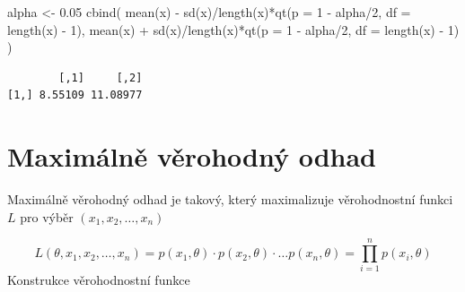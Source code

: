 \documentclass[
  letterpaper,
  DIV=11,
  numbers=noendperiod]{scrreprt}
\newenvironment{Shaded}{\begin{snugshade}}{\end{snugshade}}
\newcommand{\AttributeTok}[1]{\textcolor[rgb]{0.40,0.45,0.13}{#1}}
\newcommand{\DecValTok}[1]{\textcolor[rgb]{0.68,0.00,0.00}{#1}}
\newcommand{\FloatTok}[1]{\textcolor[rgb]{0.68,0.00,0.00}{#1}}
\newcommand{\FunctionTok}[1]{\textcolor[rgb]{0.28,0.35,0.67}{#1}}
\newcommand{\NormalTok}[1]{\textcolor[rgb]{0.00,0.23,0.31}{#1}}
\newcommand{\OtherTok}[1]{\textcolor[rgb]{0.00,0.23,0.31}{#1}}
\newcommand{\SpecialCharTok}[1]{\textcolor[rgb]{0.37,0.37,0.37}{#1}}
\begin{document}
\begin{Shaded}
\begin{Highlighting}[]
\NormalTok{alpha }\OtherTok{\textless{}{-}} \FloatTok{0.05}
\FunctionTok{cbind}\NormalTok{(}
  \FunctionTok{mean}\NormalTok{(x) }\SpecialCharTok{{-}} \FunctionTok{sd}\NormalTok{(x)}\SpecialCharTok{/}\FunctionTok{length}\NormalTok{(x)}\SpecialCharTok{*}\FunctionTok{qt}\NormalTok{(}\AttributeTok{p =} \DecValTok{1} \SpecialCharTok{{-}}\NormalTok{ alpha}\SpecialCharTok{/}\DecValTok{2}\NormalTok{, }\AttributeTok{df =} \FunctionTok{length}\NormalTok{(x) }\SpecialCharTok{{-}} \DecValTok{1}\NormalTok{),}
  \FunctionTok{mean}\NormalTok{(x) }\SpecialCharTok{+} \FunctionTok{sd}\NormalTok{(x)}\SpecialCharTok{/}\FunctionTok{length}\NormalTok{(x)}\SpecialCharTok{*}\FunctionTok{qt}\NormalTok{(}\AttributeTok{p =} \DecValTok{1} \SpecialCharTok{{-}}\NormalTok{ alpha}\SpecialCharTok{/}\DecValTok{2}\NormalTok{, }\AttributeTok{df =} \FunctionTok{length}\NormalTok{(x) }\SpecialCharTok{{-}} \DecValTok{1}\NormalTok{)}
\NormalTok{)}
\end{Highlighting}
\end{Shaded}

\begin{verbatim}
        [,1]     [,2]
[1,] 8.55109 11.08977
\end{verbatim}

\hypertarget{maximuxe1lnux11b-vux11brohodnuxfd-odhad}{%
\section{Maximálně věrohodný
odhad}\label{maximuxe1lnux11b-vux11brohodnuxfd-odhad}}

Maximálně věrohodný odhad je takový, který maximalizuje věrohodnostní
funkci \(L\) pro výběr \((x_1, x_2, \ldots, x_n)\)

\[
L(\theta, x_1, x_2, \ldots, x_n) = p(x_1, \theta) \cdot p(x_2, \theta) \cdot \ldots p(x_n, \theta) = \prod\limits_{i=1}^{n}p(x_i, \theta)
\] Konstrukce věrohodnostní funkce
\end{document}
